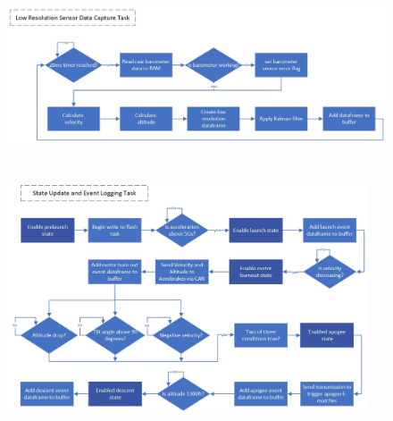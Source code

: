 \clearpage
\chapter{}\label{apdx:E}
\vfill{}
\begin{figure}[h!]
  \begin{center}
    \includegraphics[width=\textwidth]{./img/Section_4_2_2_2.jpeg}
  \end{center}
\end{figure}
\vfill{}
 
\clearpage
\chapter{}\label{apdx:F}
\vfill{}
\begin{figure}[h!]
  \begin{center}
    \includegraphics[width=0.95\textwidth]{./img/Section_4_2_2_3.jpeg}
  \end{center}
\end{figure}
\vfill{}
